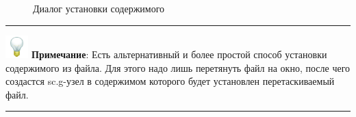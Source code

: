 \begin{itemize}
\begin{figure}[h]
		\caption{Диалог установки содержимого}
		\label{contentdialog}
	\end{figure}
	\hrule
\smallskip
\noindent\includegraphics[width=25pt, height=25pt]{../images/lamp.png} \textcolor[rgb]{.25, .67, .2}{\textbf{Примечание}: Есть альтернативный и более простой способ установки содержимого из файла. Для этого надо лишь перетянуть файл на окно, после чего создастся sc.g-узел в содержимом которого будет установлен перетаскиваемый файл.}
\smallskip
\hrule
\end{itemize}
